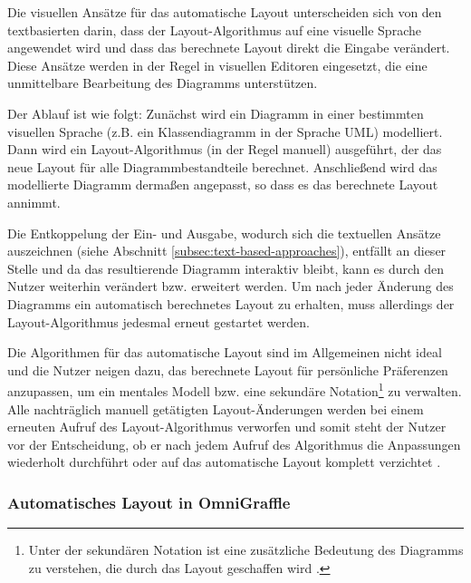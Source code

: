 Die visuellen Ansätze für das automatische Layout unterscheiden sich von den textbasierten darin, dass der Layout-Algorithmus auf eine visuelle Sprache angewendet wird und dass das berechnete Layout direkt die Eingabe verändert. Diese Ansätze werden in der Regel in visuellen Editoren eingesetzt, die eine unmittelbare Bearbeitung des Diagramms unterstützen.

Der Ablauf ist wie folgt: Zunächst wird ein Diagramm in einer bestimmten visuellen Sprache (z.B. ein Klassendiagramm in der Sprache UML) modelliert. Dann wird ein Layout-Algorithmus (in der Regel manuell) ausgeführt, der das neue Layout für alle Diagrammbestandteile berechnet. Anschließend wird das modellierte Diagramm dermaßen angepasst, so dass es das berechnete Layout annimmt.

Die Entkoppelung der Ein- und Ausgabe, wodurch sich die textuellen Ansätze auszeichnen (siehe Abschnitt \ref{subsec:text-based-approaches}), entfällt an dieser Stelle und da das resultierende Diagramm interaktiv bleibt, kann es durch den Nutzer weiterhin verändert bzw. erweitert werden. Um nach jeder Änderung des Diagramms ein automatisch berechnetes Layout zu erhalten, muss allerdings der Layout-Algorithmus jedesmal erneut gestartet werden.

Die Algorithmen für das automatische Layout sind im Allgemeinen nicht ideal und die Nutzer neigen dazu, das berechnete Layout für persönliche Präferenzen anzupassen, um ein mentales Modell bzw. eine sekundäre Notation\footnote{Unter der sekundären Notation ist eine zusätzliche Bedeutung des Diagramms zu verstehen, die durch das Layout geschaffen wird \cite{SeyboldGlinz03An-Effective}.} zu verwalten. Alle nachträglich manuell getätigten Layout-Änderungen werden bei einem erneuten Aufruf des Layout-Algorithmus verworfen und somit steht der Nutzer vor der Entscheidung, ob er nach jedem Aufruf des Algorithmus die Anpassungen wiederholt durchführt oder auf das automatische Layout komplett verzichtet \cite[S.119ff]{Eiglsperger04Automatic}.

\subsubsection{Automatisches Layout in OmniGraffle}


